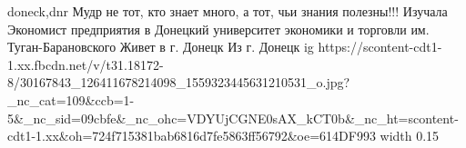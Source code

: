  
 
 
 
 

\par
doneck,dnr
Мудр не тот, кто знает много, а тот, чьи знания полезны!!!
Изучала Экономист предприятия в Донецкий университет экономики и торговли им. Туган-Барановского
Живет в г. Донецк
Из г. Донецк
\ifcmt
  ig https://scontent-cdt1-1.xx.fbcdn.net/v/t31.18172-8/30167843_126411678214098_1559323445631210531_o.jpg?_nc_cat=109&ccb=1-5&_nc_sid=09cbfe&_nc_ohc=VDYUjCGNE0sAX_kCT0b&_nc_ht=scontent-cdt1-1.xx&oh=724f715381bab6816d7fe5863ff56792&oe=614DF993
  width 0.15
\fi

